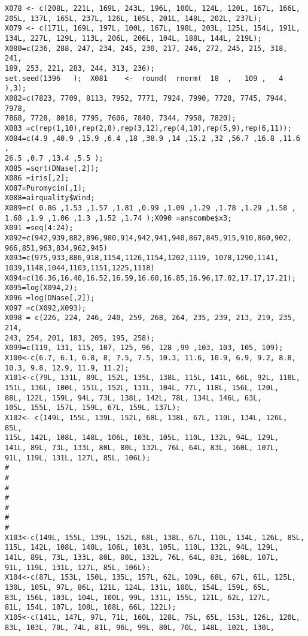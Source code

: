 \documentclass[a4paper,12pt]{article}
\begin{document}
\begin{verbatim}
X078 <- c(208L, 221L, 169L, 243L, 196L, 100L, 124L, 120L, 167L, 166L, 
205L, 137L, 165L, 237L, 126L, 105L, 201L, 148L, 202L, 237L);
X079 <- c(171L, 169L, 197L, 100L, 167L, 198L, 203L, 125L, 154L, 191L, 
134L, 227L, 129L, 113L, 206L, 206L, 104L, 188L, 144L, 219L);
X080=c(236, 288, 247, 234, 245, 230, 217, 246, 272, 245, 215, 318, 241,
189, 253, 221, 283, 244, 313, 236);
set.seed(1396	);	X081	<-	round(	rnorm(	18	,	109	,	4	),3);
X082=c(7823, 7709, 8113, 7952, 7771, 7924, 7990, 7728, 7745, 7944, 7978,
7868, 7728, 8018, 7795, 7606, 7840, 7344, 7958, 7820);
X083 =c(rep(1,10),rep(2,8),rep(3,12),rep(4,10),rep(5,9),rep(6,11));
X084=c(4.9 ,40.9 ,15.9 ,6.4 ,18 ,38.9 ,14 ,15.2 ,32 ,56.7 ,16.8 ,11.6 ,
26.5 ,0.7 ,13.4 ,5.5 );
X085 =sqrt(DNase[,2]);
X086 =iris[,2];
X087=Puromycin[,1];
X088=airquality$Wind;
X089=c( 0.86 ,1.53 ,1.57 ,1.81 ,0.99 ,1.09 ,1.29 ,1.78 ,1.29 ,1.58 ,
1.68 ,1.9 ,1.06 ,1.3 ,1.52 ,1.74 );X090 =anscombe$x3;
X091 =seq(4:24);
X092=c(942,939,882,896,980,914,942,941,940,867,845,915,910,860,902,
966,851,963,834,962,945)
X093=c(975,933,886,918,1154,1126,1154,1202,1119, 1078,1290,1141,
1039,1148,1044,1103,1151,1225,1118)
X094=c(16.36,16.40,16.52,16.59,16.60,16.85,16.96,17.02,17.17,17.21);
X095=log(X094,2);
X096 =log(DNase[,2]);
X097 =c(X092,X093);
X098 = c(226, 224, 246, 240, 259, 268, 264, 235, 239, 213, 219, 235, 214,
243, 254, 201, 183, 205, 195, 258);
X099=c(119, 131, 115, 107, 125, 96, 128 ,99 ,103, 103, 105, 109);
X100<-c(6.7, 6.1, 6.8, 8, 7.5, 7.5, 10.3, 11.6, 10.9, 6.9, 9.2, 8.8, 
10.3, 9.8, 12.9, 11.9, 11.2);
X101<-c(79L, 131L, 89L, 152L, 135L, 138L, 115L, 141L, 66L, 92L, 118L, 
151L, 136L, 100L, 151L, 152L, 131L, 104L, 77L, 118L, 156L, 120L, 
88L, 122L, 159L, 94L, 73L, 138L, 142L, 78L, 134L, 146L, 63L, 
105L, 155L, 157L, 159L, 67L, 159L, 137L);
X102<- c(149L, 155L, 139L, 152L, 68L, 138L, 67L, 110L, 134L, 126L, 85L, 
115L, 142L, 108L, 148L, 106L, 103L, 105L, 110L, 132L, 94L, 129L, 
141L, 89L, 73L, 133L, 80L, 80L, 132L, 76L, 64L, 83L, 160L, 107L, 
91L, 119L, 131L, 127L, 85L, 106L);
#
#
#
#
#
#
#
X103<-c(149L, 155L, 139L, 152L, 68L, 138L, 67L, 110L, 134L, 126L, 85L, 
115L, 142L, 108L, 148L, 106L, 103L, 105L, 110L, 132L, 94L, 129L, 
141L, 89L, 73L, 133L, 80L, 80L, 132L, 76L, 64L, 83L, 160L, 107L, 
91L, 119L, 131L, 127L, 85L, 106L);
X104<-c(87L, 153L, 150L, 135L, 157L, 62L, 109L, 68L, 67L, 61L, 125L, 
130L, 105L, 97L, 86L, 121L, 124L, 131L, 100L, 154L, 159L, 65L, 
83L, 156L, 103L, 104L, 100L, 99L, 131L, 155L, 121L, 62L, 127L, 
81L, 154L, 107L, 108L, 108L, 66L, 122L);
X105<-c(141L, 147L, 97L, 71L, 160L, 128L, 75L, 65L, 153L, 126L, 120L, 
83L, 103L, 70L, 74L, 81L, 96L, 99L, 80L, 70L, 148L, 102L, 130L, 

\end{verbatim}
\end{document}
